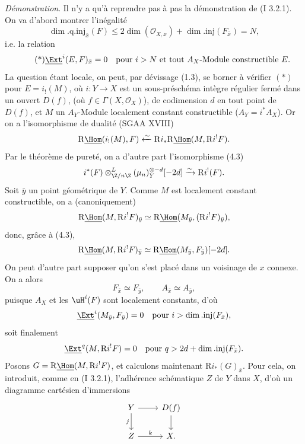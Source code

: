 \emph{Démonstration}. Il n'y a qu'à reprendre pas à pas la démonstration de (I 3.2.1). On va d'abord montrer l'inégalité
\[
        \dim.\mathrm{q.inj}_{\bar{x}}(F)\leq 2\dim(\mathcal{O}_{X,x})+\dim.\mathrm{inj}(F_{\bar{x}})=N,
\]
i.e. la relation
\begin{equation}\tag{*}
        \underline{\Ext}^{i}(E,F)_{\bar{x}}=0\quad\hbox{pour } i>N\hbox{ et tout }A_X\hbox{-Module constructible }E.
\end{equation}
La question étant locale, on peut, par dévissage (1.3), se borner à vérifier $(*)$ pour $E=i_!(M)$, où $i:Y\to X$ est un sous-préschéma intègre régulier fermé dans un ouvert $D(f)$, (où $f\in\Gamma(X,\mathcal{O}_X)$), de codimension $d$ en tout point de $D(f)$, et $M$ un $A_Y$-Module localement constant constructible ($A_Y=i^*A_X$).
Or on a l'isomorphisme de dualité (SGAA XVIII)
\[
        \mathrm{R}\underline{\Hom}(i_!(M),F)\xleftarrow{\sim} \mathrm{R} i_*\mathrm{R}\underline{\Hom}(M,\mathrm{R} i^!F).
\]
Par le théorème de pureté, on a d'autre part l'isomorphisme (4.3)
\[
        i^*(F)\otimes^L_{\Z/n\Z}(\mu_n)_Y^{\otimes -d}[-2d]\xrightarrow{\sim}\mathrm{R} i^!(F).
\]
Soit $\bar{y}$ un point géométrique de $Y$. Comme $M$ est localement constant constructible, on a (canoniquement)
\[
        \mathrm{R}\underline{\Hom}(M,\mathrm{R} i^!F)_{\bar{y}}\simeq \mathrm{R}\underline{\Hom}(M_{\bar{y}},(\mathrm{R} i^!F)_{\bar{y}}),
\]
donc, grâce à (4.3),
\[
        \mathrm{R}\underline{\Hom}(M,\mathrm{R} i^!F)_{\bar{y}}\simeq \mathrm{R}\underline{\Hom}(M_{\bar{y}},F_{\bar{y}})[-2d].
\]
On peut d'autre part supposer qu'on s'est placé dans un voisinage de $x$ connexe. On a alors
\[
        F_{\bar{x}}\simeq F_{\bar{y}},\qquad A_{\bar{x}}\simeq A_{\bar{y}},
\]
puisque $A_X$ et les $\uH^i(F)$ sont localement constants, d'où
\[
        \underline{\Ext}^i(M_{\bar{y}},F_{\bar{y}})=0\quad\hbox{pour }i>\dim.\mathrm{inj}(F_{\bar{x}}),
\]
soit finalement
\[
        \underline{\Ext}^{q}(M,\mathrm{R} i^!F)=0\quad\hbox{pour }q>2d+\dim.\mathrm{inj}(F_{\bar{x}}).
\]
Posons $G=\mathrm{R}\underline{\Hom}(M,\mathrm{R} i^!F)$, et calculons maintenant $\mathrm{R} i_*(G)_{\bar{x}}$. Pour cela, on introduit, comme en (I 3.2.1), l'adhérence schématique $Z$ de $Y$ dans $X$, d'où un diagramme cartésien d'immersions
\[
\begin{tikzcd}
Y \arrow[r] \arrow[d,"j"'] & D(f) \arrow[d]\\
Z \arrow[r,"k"] & X.
\end{tikzcd}
\]
